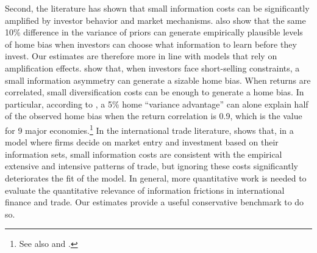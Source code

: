 Second, the literature has shown that small information costs can be significantly amplified by investor behavior and market mechanisms. \citet{VanNieuwerburghVeldkamp2009} also show that the same 10\% difference in the variance of priors can generate empirically plausible levels of home bias when investors can choose what information to learn before they invest. Our estimates are therefore more in line with models that rely on amplification effects. \citet{Hatchondo2008} show that, when investors face short-selling constraints, a small information asymmetry can generate a sizable home bias. When returns are correlated, small diversification costs can be enough to generate a home bias. In particular, according to \citet{Wallmeier2022}, a 5\% home ``variance advantage'' can alone explain half of the observed home bias when the return correlation is 0.9, which is the value for 9 major economies.\footnote{See also \citet{Bhamra2014} and \citet{Levy2014}.} In the international trade literature, \citet{Allen2014} shows that, in a model where firms decide on market entry and investment based on their information sets, small information costs are consistent with the empirical extensive and intensive patterns of trade, but ignoring these costs significantly deteriorates the fit of the model. In general, more quantitative work is needed to evaluate the quantitative relevance of information frictions in international finance and trade. Our estimates provide a useful conservative benchmark to do so.





